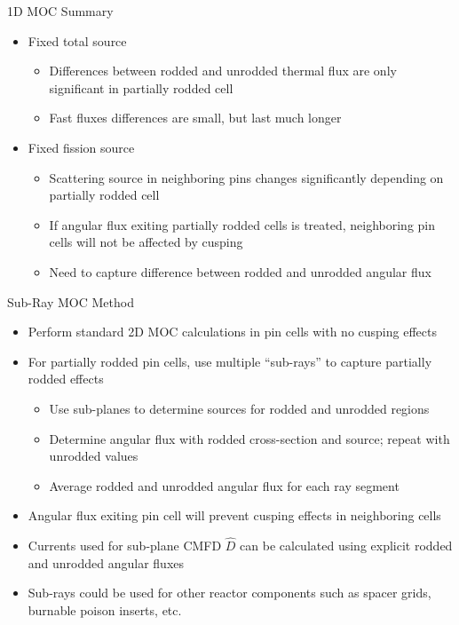 
\begin{frame}[t]{1D MOC Summary}
    
    \begin{itemize}
        \item Fixed total source
        \begin{itemize}
            \item Differences between rodded and unrodded thermal flux are only significant in partially rodded cell
            \item Fast fluxes differences are small, but last much longer
        \end{itemize}
        \item Fixed fission source
        \begin{itemize}
            \item Scattering source in neighboring pins changes significantly depending on partially rodded cell
            \item If angular flux exiting partially rodded cells is treated, neighboring pin cells will not be affected by cusping
            \item Need to capture difference between rodded and unrodded angular flux
        \end{itemize}
    \end{itemize}
    
\end{frame}


\begin{frame}[t]{Sub-Ray MOC Method}
    
    \begin{itemize}
        \item Perform standard 2D MOC calculations in pin cells with no cusping effects
        \item For partially rodded pin cells, use multiple ``sub-rays'' to capture partially rodded effects
        \begin{itemize}
            \item Use sub-planes to determine sources for rodded and unrodded regions
            \item Determine angular flux with rodded cross-section and source; repeat with unrodded values
            \item Average rodded and unrodded angular flux for each ray segment
        \end{itemize}
        \item Angular flux exiting pin cell will prevent cusping effects in neighboring cells
        \item Currents used for sub-plane CMFD $\hat{D}$ can be calculated using explicit rodded and unrodded angular fluxes
        \item Sub-rays could be used for other reactor components such as spacer grids, burnable poison inserts, etc.
    \end{itemize}
    
\end{frame}